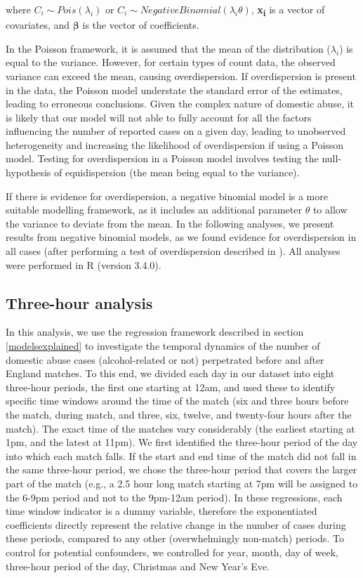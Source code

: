 \documentclass[12pt, a4paper]{article}
\begin{document}
where 
$C_i \sim Pois(\lambda_i)$ or $C_i \sim Negative Binomial(\lambda_i\theta)$, \textbf{x\textsubscript{i}} is a vector of covariates, and $\boldsymbol{\beta}$ is the vector of coefficients.

In the Poisson framework, it is assumed that the mean of the distribution ($\lambda_i$) is equal to the variance. However, for certain types of count data, the observed variance can exceed the mean, causing overdispersion. If overdispersion is present in the data, the Poisson model understate the standard error of the estimates, leading to erroneous conclusions. Given the complex nature of domestic abuse, it is likely that our model will not able to fully account for all the factors influencing the number of reported cases on a given day, leading to unobserved heterogeneity and increasing the likelihood of overdispersion if using a Poisson model. Testing for overdispersion in a Poisson model involves testing the null-hypothesis of equidispersion (the mean being equal to the variance).

If there is evidence for overdispersion, a negative binomial model is a more suitable modelling framework, as it includes an additional parameter $\theta$ to allow the variance to deviate from the mean. In the following analyses, we present results from negative binomial models, as we found evidence for overdispersion in all cases (after performing a test of overdispersion described in ). All analyses were performed in R (version 3.4.0).


\subsection{Three-hour analysis}

In this analysis, we use the regression framework described in section \ref{modelsexplained} to investigate the temporal dynamics of the number of domestic abuse cases (alcohol-related or not) perpetrated before and after England matches. To this end, we divided each day in our dataset into eight three-hour periods, the first one starting at 12am, and used these to identify specific time windows around the time of the match (six and three hours before the match, during match, and three, six, twelve, and twenty-four hours after the match). The exact time of the matches vary considerably (the earliest starting at 1pm, and the latest at 11pm). We first identified the three-hour period of the day into which each match falls. If the start and end time of the match did not fall in the same three-hour period, we chose the three-hour period that covers the larger part of the match (e.g., a 2.5 hour long match starting at 7pm will be assigned to the 6-9pm period and not to the 9pm-12am period). In these regressions, each time window indicator is a dummy variable, therefore the exponentiated coefficients directly represent the relative change in the number of cases during these periods, compared to any other (overwhelmingly non-match) periods. To control for potential confounders, we controlled for year, month, day of week, three-hour period of the day, Christmas and New Year's Eve.
\end{document}
